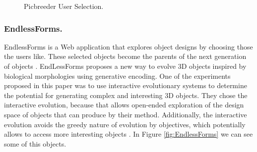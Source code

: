 \begin{figure}
\captionsetup{justification=centering,margin=2cm}
\centering
\setlength\fboxsep{0pt}
\setlength\fboxrule{0.7pt}
\caption{Picbreeder User Selection.}
\label{fig:Picbreeder}
\end{figure}

\subsubsection{EndlessForms.}
EndlessForms is a Web application that explores object designs by choosing those
the users like. These selected objects become the parents of the next generation
of objects \cite{clune2011evolving}. EndLessForms proposes a new way to evolve
3D objects inspired by biological morphologies using generative encoding. One of
the experiments proposed in this paper was to use interactive evolutionary
systems to determine the potential for generating complex and interesting 3D
objects. They chose the interactive evolution, because that allows open-ended
exploration of the design space of objects that can produce by their method.
Additionally, the interactive evolution avoids the greedy nature of evolution by
objectives, which potentially allows to access more interesting objects
\cite{clune2011evolving}. In Figure \ref{fig:EndlessForms} we can see some of
this objects.

